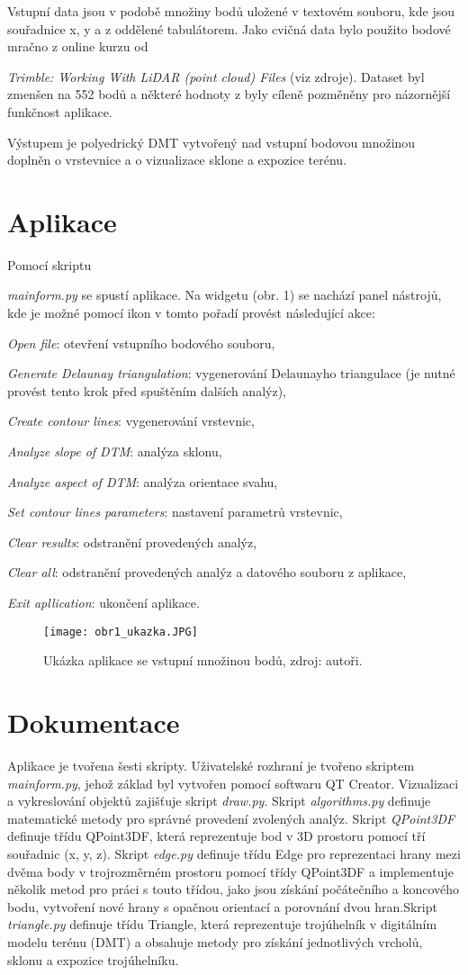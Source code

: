 \documentclass[a4paper,12pt]{article}
\begin{document}
    Vstupní data jsou v podobě množiny bodů uložené v textovém souboru, kde jsou souřadnice x, y a z oddělené tabulátorem. Jako cvičná data bylo použito bodové mračno z online kurzu od {\textit{Trimble: Working With LiDAR (point cloud) Files} (viz zdroje). Dataset byl zmenšen na 552 bodů a některé hodnoty z byly cíleně pozměněny pro názornější funkčnost aplikace.

    Výstupem je polyedrický DMT vytvořený nad vstupní bodovou množinou doplněn o vrstevnice a o vizualizace sklone a expozice terénu.

    \section{Aplikace}
    Pomocí skriptu {\textit{mainform.py} se spustí aplikace. Na widgetu (obr. 1) se nachází panel nástrojů, kde je možné pomocí ikon v tomto pořadí provést následující akce: {\textit{Open file}: otevření vstupního bodového souboru, {\textit{Generate Delaunay triangulation}: vygenerování Delaunayho triangulace (je nutné provést tento krok před spuštěním dalších analýz), {\textit{Create contour lines}: vygenerování vrstevnic, {\textit{Analyze slope of DTM}: analýza sklonu, {\textit{Analyze aspect of DTM}: analýza orientace svahu, {\textit{Set contour lines parameters}: nastavení parametrů vrstevnic, {\textit{Clear results}: odstranění provedených analýz, {\textit{Clear all}: odstranění provedených analýz a datového souboru z aplikace,{\textit{Exit apllication}: ukončení aplikace.

    \begin{figure}[htbp]
    \texttt{[image: obr1\_ukazka.JPG]}
    \centering
    \caption{Ukázka aplikace se vstupní množinou bodů, zdroj: autoři.}
    \label{fig:obr1}
    \end{figure}

    \section{Dokumentace}
    Aplikace je tvořena šesti skripty. Uživatelské rozhraní je tvořeno skriptem {\textit{mainform.py}}, jehož základ byl vytvořen pomocí softwaru QT Creator. Vizualizaci a vykreslování objektů zajišťuje skript {\textit{draw.py}}. Skript {\textit{algorithms.py}} definuje matematické metody pro správné provedení zvolených analýz. Skript {\textit{QPoint3DF}} definuje třídu QPoint3DF, která reprezentuje bod v 3D prostoru pomocí tří souřadnic (x, y, z). Skript {\textit{edge.py}} definuje třídu Edge pro reprezentaci hrany mezi dvěma body v trojrozměrném prostoru pomocí třídy QPoint3DF a implementuje několik metod pro práci s touto třídou, jako jsou získání počátečního a koncového bodu, vytvoření nové hrany s opačnou orientací a porovnání dvou hran.Skript {\textit{triangle.py}} definuje třídu Triangle, která reprezentuje trojúhelník v digitálním modelu terénu (DMT) a obsahuje metody pro získání jednotlivých vrcholů, sklonu a expozice trojúhelníku.

}}}}}}}}}}}
\end{document}
